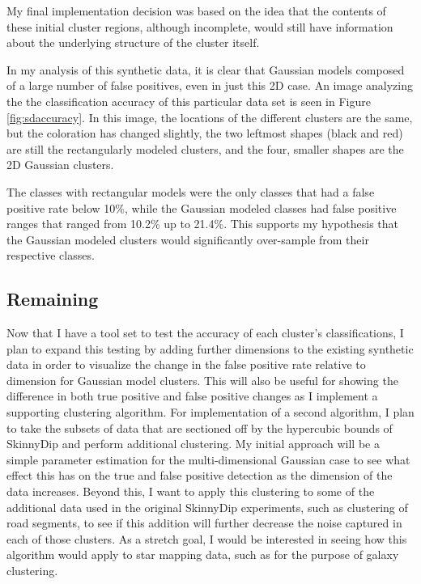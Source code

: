 \documentclass{sig-alternate-05-2015}
\begin{document}
My final implementation decision was based on the idea that the contents of these initial cluster regions, although incomplete, would still have information about the underlying structure of the cluster itself.

In my analysis of this synthetic data, it is clear that Gaussian models composed of a large number of false positives, even in just this 2D case. An image analyzing the the classification accuracy of this particular data set is seen in Figure \ref{fig:sdaccuracy}. In this image, the locations of the different clusters are the same, but the coloration has changed slightly, the two leftmost shapes (black and red) are still the rectangularly modeled clusters, and the four, smaller shapes are the 2D Gaussian clusters.

The classes with rectangular models were the only classes that had a false positive rate below 10\%, while the Gaussian modeled classes had false positive ranges that ranged from 10.2\% up to 21.4\%. This supports my hypothesis that the Gaussian modeled clusters would significantly over-sample from their respective classes.








\subsection{Remaining}
Now that I have a tool set to test the accuracy of each cluster's classifications, I plan to expand this testing by adding further dimensions to the existing synthetic data in order to visualize the change in the false positive rate relative to dimension for Gaussian model clusters. This will also be useful for showing the difference in both true positive and false positive changes as I implement a supporting clustering algorithm.
For implementation of a second algorithm, I plan to take the subsets of data that are sectioned off by the hypercubic bounds of SkinnyDip and perform additional clustering. My initial approach will be a simple parameter estimation for the multi-dimensional Gaussian case to see what effect this has on the true and false positive detection as the dimension of the data increases.
Beyond this, I want to apply this clustering to some of the additional data used in the original SkinnyDip experiments, such as clustering of road segments, to see if this addition will further decrease the noise captured in each of those clusters. As a stretch goal, I would be interested in seeing how this algorithm would apply to star mapping data, such as for the purpose of galaxy clustering.
\end{document}
